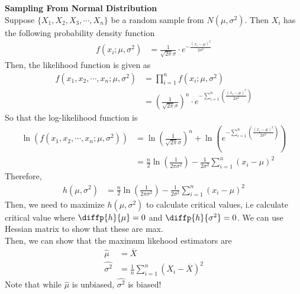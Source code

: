 \begin{ex}
\textbf{Sampling From Normal Distribution}\\
Suppose $\{X_1,X_2,X_3,\cdots,X_n\}$ be a random sample from $N(\mu,\sigma^2)$. Then $X_i$ has the following probability density function \begin{align*}
f(x_i;\mu,\sigma^2)&=\frac{1}{\sqrt{2\pi} \sigma}\cdot e^{-\frac{(x_i-\mu)^2}{2\sigma^2}}
\end{align*} 
Then, the likelihood function is given as \begin{align*}
f(x_1,x_2,\cdots,x_n;\mu, \sigma^2)&=\prod_{i=1}^n f(x_i;\mu, \sigma^2)\\
&=\left(\frac{1}{\sqrt{2\pi}\sigma} \right)^n\cdot e^{-\sum_{i=1}^n\left(\frac{(x_i-\mu)^2}{2\sigma^2} \right)}
\end{align*}
So that the log-likelihood function is \begin{align*}
\ln(f(x_1,x_2,\cdots,x_n;\mu,\sigma^2))&=\ln\left(\frac{1}{\sqrt{2\pi}\sigma} \right)^n+\ln \left( e^{-\sum_{i=1}^n\left(\frac{(x_i-\mu)^2}{2\sigma^2}\right)}\right)\\
&=\frac{n}{2}\ln \left(\frac{1}{2\pi \sigma^2} \right)-\frac{1}{2\sigma^2}\sum_{i=1}^n(x_i-\mu)^2
\end{align*}
Therefore, \begin{align*}
h(\mu, \sigma^2)&=\frac{n}{2}\ln\left(\frac{1}{2\pi \sigma^2} \right)-\frac{1}{2\sigma^2}\sum_{i=1}^n(x_i-\mu)^2
\end{align*}
Then, we need to maximize $h(\mu,\sigma^2)$ to calculate critical values, i.e calculate critical value where $\diffp{h}{\mu}=0 $ and $\diffp{h}{{{\sigma^2}}}=0 $. We can use Hessian matrix to show that these are max.\\
Then, we can show that the maximum likehood estimators are \begin{align*}
\widehat{\mu}&=\overline{X}\\
\widehat{\sigma^2}&=\frac{1}{n}\sum_{i=1}^n\left(X_i-\overline{X} \right)^2
\end{align*}
Note that while $\widehat{\mu}$ is unbiased, $\widehat{\sigma^2}$ is biased!
\end{ex}
